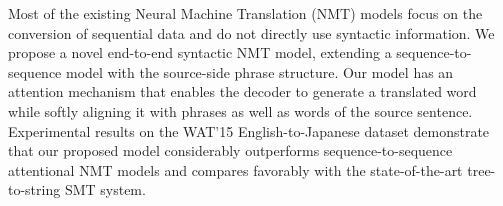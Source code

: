 Most of the existing Neural Machine Translation (NMT) models focus on the conversion of sequential data and do not directly use syntactic information. We propose a novel end-to-end syntactic NMT model, extending a sequence-to-sequence model with the source-side phrase structure. Our model has an attention mechanism that enables the decoder to generate a translated word while softly aligning it with phrases as well as words of the source sentence. Experimental results on the WAT'15 English-to-Japanese dataset demonstrate that our proposed model considerably outperforms sequence-to-sequence attentional NMT models and compares favorably with the state-of-the-art tree-to-string SMT system.
